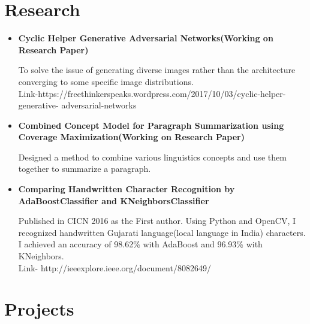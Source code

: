 \documentclass[11pt,a4paper,sans]{moderncv}        %
\begin{document}
\vspace{2pt}

\section{Research}

\vspace{5pt}

\begin{itemize}

\item{\textbf{Cyclic Helper Generative Adversarial Networks(Working on Research Paper)} 

\vspace{3pt}

\small{To solve the issue of generating diverse images rather than the architecture converging to some specific image distributions.\\Link-https://freethinkerspeaks.wordpress.com/2017/10/03/cyclic-helper-generative- adversarial-networks}}
\vspace{5pt}

\item{\textbf{Combined Concept Model for Paragraph Summarization using Coverage Maximization(Working on Research Paper)} 

\vspace{3pt}

\small{Designed a method to combine various linguistics concepts and use them together to summarize a paragraph.}}

\vspace{5pt}

\item{\textbf{Comparing Handwritten Character Recognition by AdaBoostClassifier and KNeighborsClassifier}

\vspace{3pt}

\small{Published in CICN 2016 as the First author. Using Python and OpenCV, I recognized handwritten Gujarati language(local language in India) characters. I achieved an accuracy of 98.62\% with AdaBoost and 96.93\% with KNeighbors.  \\Link- http://ieeexplore.ieee.org/document/8082649/}}

\end{itemize}

\vspace{2pt}

\section{Projects}
\end{document}
